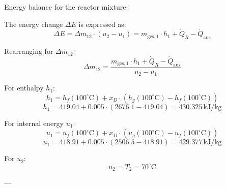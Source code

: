 Energy balance for the reactor mixture:  

The energy change \( \Delta E \) is expressed as:  
\[
\Delta E = \Delta m_{12} \cdot (u_2 - u_1) = m_{\text{ges},1} \cdot h_1 + \dot{Q}_R - \dot{Q}_{\text{aus}}
\]  

Rearranging for \( \Delta m_{12} \):  
\[
\Delta m_{12} = \frac{m_{\text{ges},1} \cdot h_1 + \dot{Q}_R - \dot{Q}_{\text{aus}}}{u_2 - u_1}
\]  

For enthalpy \( h_1 \):  
\[
h_1 = h_f(100^\circ\text{C}) + x_D \cdot (h_g(100^\circ\text{C}) - h_f(100^\circ\text{C}))
\]  
\[
h_1 = 419.04 + 0.005 \cdot (2676.1 - 419.04) = 430.325 \, \text{kJ/kg}
\]  

For internal energy \( u_1 \):  
\[
u_1 = u_f(100^\circ\text{C}) + x_D \cdot (u_g(100^\circ\text{C}) - u_f(100^\circ\text{C}))
\]  
\[
u_1 = 418.91 + 0.005 \cdot (2506.5 - 418.91) = 429.377 \, \text{kJ/kg}
\]  

For \( u_2 \):  
\[
u_2 = T_2 = 70^\circ\text{C}
\]  

---
